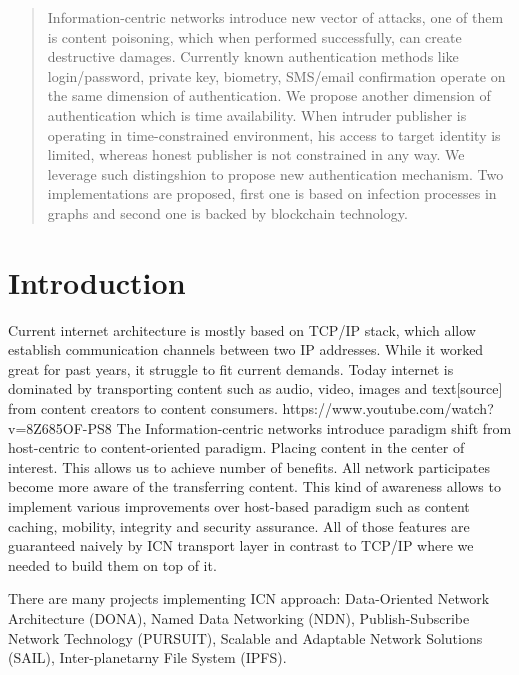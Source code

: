 \documentclass[nostrict]{szablonPG}
\begin{document}
\tableofcontents
\listoffigures


\begin{abstract}
Information-centric networks introduce new vector of attacks, one of them is content poisoning, which when performed successfully, can create destructive damages. Currently known authentication methods like login/password, private key, biometry, SMS/email confirmation operate on the same dimension of authentication. We propose another dimension of authentication which is time availability. When intruder publisher is operating in time-constrained environment, his access to target identity is limited, whereas honest publisher is not constrained in any way. We leverage such distingshion to propose new authentication mechanism. Two implementations are proposed, first one is based on infection processes in graphs and second one is backed by blockchain technology. 


\end{abstract}


\section{Introduction}
Current internet architecture is mostly based on TCP/IP stack, which allow  establish communication channels between two IP addresses. While it worked great for past years,  it struggle to fit current demands. Today internet is dominated by transporting content such as audio, video, images and text[source] from content creators to content consumers. 
https://www.youtube.com/watch?v=8Z685OF-PS8
The Information-centric networks introduce paradigm shift from host-centric to content-oriented paradigm. Placing content in the center of interest. This allows us to achieve number of benefits. All network participates become more aware of the transferring content. This kind of awareness allows to implement various improvements over host-based paradigm such as content caching, mobility, integrity and security assurance. All of those features are guaranteed naively by ICN transport layer in contrast to TCP/IP where we needed to build them on top of it. 

There are many projects implementing ICN approach: Data-Oriented Network Architecture (DONA), Named Data Networking (NDN), Publish-Subscribe Network Technology (PURSUIT), Scalable and Adaptable Network Solutions (SAIL), Inter-planetarny File System (IPFS).
\end{document}
